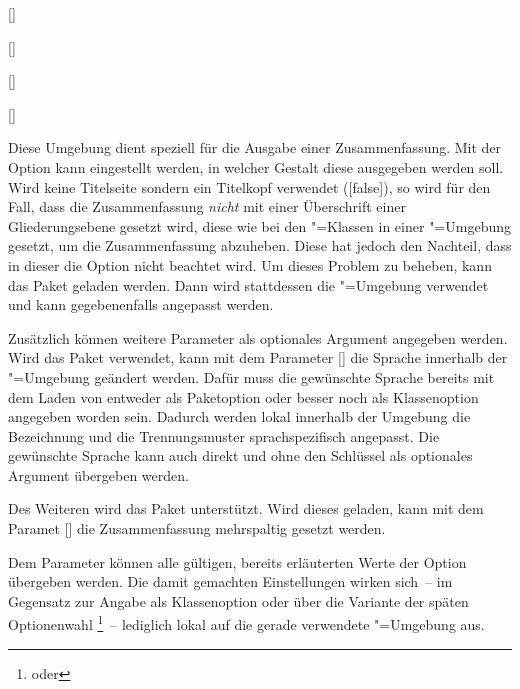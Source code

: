 \documentclass[%
  english,ngerman,%
  headings=optiontoheadandtoc,captions=tableheading,numbers=noenddot,%
  chapterpage,cdfoot,%
]{tudscrman}
\begin{document}
\begin{Declaration}{[]}
\begin{Declaration}{[]}
\begin{Declaration}{[]}
\begin{Declaration}{[\PSet]}
\printdeclarationlist%
%

Diese Umgebung dient speziell für die Ausgabe einer Zusammenfassung. Mit der 
Option  kann eingestellt werden, in welcher Gestalt diese 
ausgegeben werden soll. Wird keine Titelseite sondern ein Titelkopf verwendet 
([false]), so wird für den Fall, dass die Zusammenfassung 
\emph{nicht} mit einer Überschrift einer Gliederungsebene gesetzt wird, diese 
wie bei den \KOMAScript"=Klassen in einer "=Umgebung 
gesetzt, um die Zusammenfassung abzuheben. Diese hat jedoch den Nachteil, dass 
in dieser die Option  nicht beachtet wird. Um dieses Problem zu 
beheben, kann das Paket  geladen werden. Dann wird 
stattdessen 
die "=Umgebung verwendet und kann gegebenenfalls angepasst 
werden.

Zusätzlich können weitere Parameter als optionales Argument angegeben werden. 
Wird das Paket  verwendet, kann mit dem Parameter 
[] die Sprache innerhalb 
der "=Umgebung geändert werden. Dafür muss die gewünschte 
Sprache bereits mit dem Laden von  entweder als Paketoption oder 
besser noch als Klassenoption angegeben worden sein. Dadurch werden lokal 
innerhalb der Umgebung die Bezeichnung  und die 
Trennungsmuster sprachspezifisch angepasst. Die gewünschte Sprache kann auch 
direkt und ohne den Schlüssel  als 
optionales Argument übergeben werden.

Des Weiteren wird das Paket  unterstützt. Wird dieses geladen, 
kann mit dem Paramet [] die 
Zusammenfassung mehrspaltig gesetzt werden.

Dem Parameter  können alle gültigen, 
bereits erläuterten Werte der Option  übergeben werden. 
Die damit gemachten Einstellungen wirken sich~-- im Gegensatz zur Angabe als 
Klassenoption oder über die Variante der späten Optionenwahl%
\footnote{%
   oder
}~-- lediglich lokal 
auf die gerade verwendete "=Umgebung aus.


\end{Declaration}
\end{Declaration}
\end{Declaration}
\end{Declaration}
\end{document}

